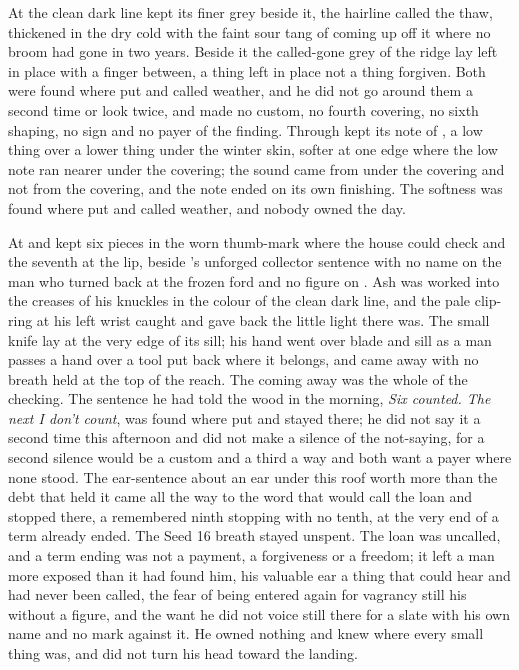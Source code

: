 At  the clean dark line kept its finer grey beside it, the hairline called the thaw, thickened in the dry cold with the faint sour tang of  coming up off it where no broom had gone in two years. Beside it the called-gone grey of the ridge lay left in place with a finger between, a thing left in place not a thing forgiven. Both were found where put and called weather, and he did not go around them a second time or look twice, and made no custom, no fourth covering, no sixth shaping, no sign and no payer of the finding. Through   kept its note of , a low thing over a lower thing under the winter skin, softer at one edge where the low note ran nearer under the covering; the sound came from under the covering and not from the covering, and the note ended on its own finishing. The softness was found where put and called weather, and nobody owned the day.

At  and   kept six pieces in the worn thumb-mark where the house could check and the seventh at the lip, beside 's unforged collector sentence with no name on the man who turned back at the frozen ford and no figure on . Ash was worked into the creases of his knuckles in the colour of the clean dark line, and the pale clip-ring at his left wrist caught and gave back the little light there was. The small knife lay at the very edge of its sill; his hand went over blade and sill as a man passes a hand over a tool put back where it belongs, and came away with no breath held at the top of the reach. The coming away was the whole of the checking. The sentence he had told the wood in the morning, \emph{Six counted. The next I don't count}, was found where put and stayed there; he did not say it a second time this afternoon and did not make a silence of the not-saying, for a second silence would be a custom and a third a way and both want a payer where none stood. The ear-sentence about an ear under this roof worth more than the debt that held it came all the way to the word that would call the loan and stopped there, a remembered ninth stopping with no tenth, at the very end of a term already ended. The Seed 16 breath stayed unspent. The loan was uncalled, and a term ending was not a payment, a forgiveness or a freedom; it left a man more exposed than it had found him, his valuable ear a thing that could hear and had never been called, the fear of being entered again for vagrancy still his without a figure, and the want he did not voice still there for a slate with his own name and no mark against it. He owned nothing and knew where every small thing was, and did not turn his head toward the landing.

